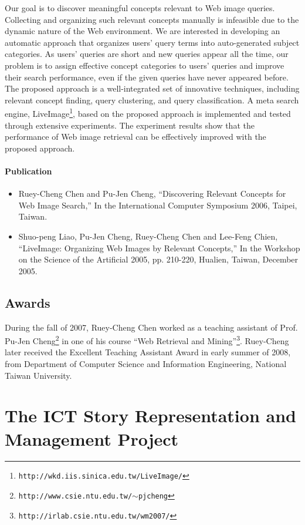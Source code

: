 \documentclass{article}[12pt]
\newcommand\url[1]{\texttt{#1}}
\begin{document}
Our goal is to discover meaningful concepts relevant to Web image queries.
Collecting and organizing such relevant concepts manually is infeasible due to
the dynamic nature of the Web environment. We are interested in developing an
automatic approach that organizes users' query terms into auto-generated
subject categories. As users' queries are short and new queries appear all the
time, our problem is to assign effective concept categories to users' queries
and improve their search performance, even if the given queries have never
appeared before. The proposed approach is a well-integrated set of innovative
techniques, including relevant concept finding, query clustering, and query
classification. A meta search engine,
LiveImage\footnote{\url{http://wkd.iis.sinica.edu.tw/LiveImage/}}, based on the
proposed approach is implemented and tested through extensive experiments. The
experiment results show that the performance of Web image retrieval can be
effectively improved with the proposed approach.

\paragraph{Publication}
\begin{itemize}
  \item Ruey-Cheng Chen and Pu-Jen Cheng, ``Discovering Relevant Concepts for
  Web Image Search,'' In the International Computer Symposium 2006, Taipei,
  Taiwan.  \item Shuo-peng Liao, Pu-Jen Cheng, Ruey-Cheng Chen and Lee-Feng
  Chien, ``LiveImage: Organizing Web Images by Relevant Concepts,'' In the
  Workshop on the Science of the Artificial 2005, pp. 210-220, Hualien, Taiwan,
  December 2005.  
\end{itemize}

\subsection{Awards}

During the fall of 2007, Ruey-Cheng Chen worked as a teaching assistant of
Prof. Pu-Jen Cheng\footnote{\url{http://www.csie.ntu.edu.tw/$\sim$pjcheng}} in
one of his course ``Web Retrieval and
Mining''\footnote{\url{http://irlab.csie.ntu.edu.tw/wm2007/}}.  Ruey-Cheng
later received the Excellent Teaching Assistant Award in early summer of
2008, from Department of Computer Science and Information Engineering, National
Taiwan University.
  
\section{The ICT Story Representation and Management Project}
\end{document}
